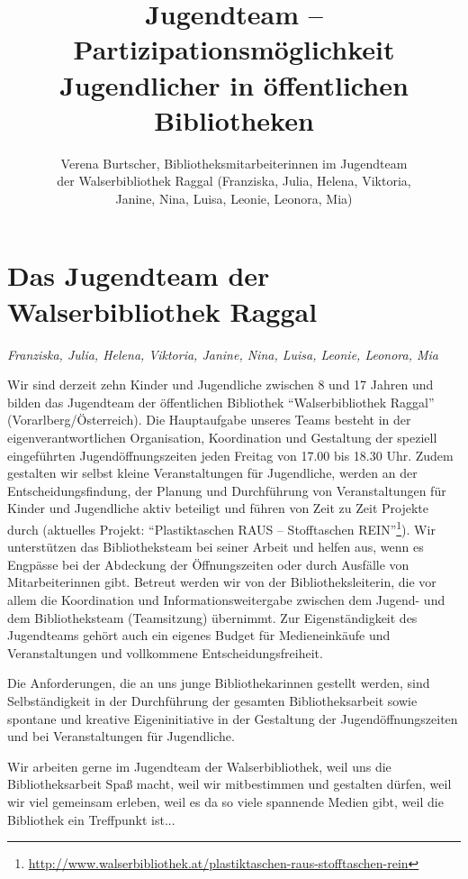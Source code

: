 \documentclass[a4paper,
fontsize=11pt,
oneside,
numbers=noperiodatend,
parskip=half-,
bibliography=totoc,
final
]{scrartcl}
\title{\LARGE{Jugendteam -- Partizipationsmöglichkeit Jugendlicher in öffentlichen Bibliotheken}} %
\author{Verena Burtscher, Bibliotheksmitarbeiterinnen im Jugendteam \\ der Walserbibliothek Raggal (Franziska, Julia, Helena, Viktoria, \\ Janine, Nina, Luisa, Leonie, Leonora, Mia)} %
\date{}
\begin{document}
\maketitle
\thispagestyle{fancyplain} 


\hypertarget{das-jugendteam-der-walserbibliothek-raggal}{%
\section*{Das Jugendteam der Walserbibliothek
Raggal}\label{das-jugendteam-der-walserbibliothek-raggal}}

\emph{Franziska, Julia, Helena, Viktoria, Janine, Nina, Luisa, Leonie,
Leonora, Mia}

Wir sind derzeit zehn Kinder und Jugendliche zwischen 8 und 17 Jahren
und bilden das Jugendteam der öffentlichen Bibliothek
\enquote{Walserbibliothek Raggal} (Vorarlberg/Österreich). Die
Hauptaufgabe unseres Teams besteht in der eigenverantwortlichen
Organisation, Koordination und Gestaltung der speziell eingeführten
Jugendöffnungszeiten jeden Freitag von 17.00 bis 18.30 Uhr. Zudem
gestalten wir selbst kleine Veranstaltungen für Jugendliche, werden an
der Entscheidungsfindung, der Planung und Durchführung von
Veranstaltungen für Kinder und Jugendliche aktiv beteiligt und führen
von Zeit zu Zeit Projekte durch (aktuelles Projekt:
\enquote{Plastiktaschen RAUS -- Stofftaschen REIN}\footnote{\url{http://www.walserbibliothek.at/plastiktaschen-raus-stofftaschen-rein}}).
Wir unterstützen das Bibliotheksteam bei seiner Arbeit und helfen aus,
wenn es Engpässe bei der Abdeckung der Öffnungszeiten oder durch
Ausfälle von Mitarbeiterinnen gibt. Betreut werden wir von der
Bibliotheksleiterin, die vor allem die Koordination und
Informationsweitergabe zwischen dem Jugend- und dem Bibliotheksteam
(Teamsitzung) übernimmt. Zur Eigenständigkeit des Jugendteams gehört
auch ein eigenes Budget für Medieneinkäufe und Veranstaltungen und
vollkommene Entscheidungsfreiheit.

Die Anforderungen, die an uns junge Bibliothekarinnen gestellt werden,
sind Selbständigkeit in der Durchführung der gesamten Bibliotheksarbeit
sowie spontane und kreative Eigeninitiative in der Gestaltung der
Jugendöffnungszeiten und bei Veranstaltungen für Jugendliche.

Wir arbeiten gerne im Jugendteam der Walserbibliothek, weil uns die
Bibliotheksarbeit Spaß macht, weil wir mitbestimmen und gestalten
dürfen, weil wir viel gemeinsam erleben, weil es da so viele spannende
Medien gibt, weil die Bibliothek ein Treffpunkt ist...
\end{document}
